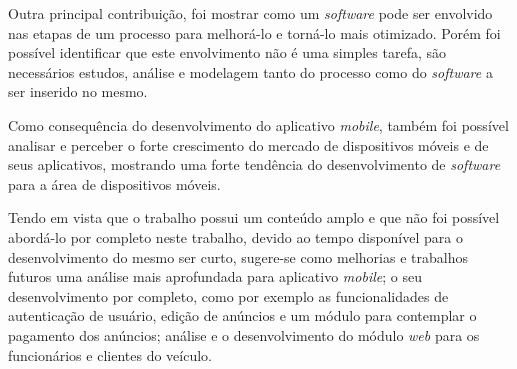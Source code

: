 \documentclass[
	12pt,				%
	openright,			%
	oneside,			%
	a4paper,			%
	chapter=TITLE,		%
	section=TITLE,		%
	english,			%
	french,				%
	spanish,			%
	brazil				%
	]{abntex2}
\begin{document}
Outra principal contribuição, foi mostrar como um \textit{software} pode ser envolvido nas etapas de um processo para melhorá-lo e torná-lo mais otimizado. Porém foi possível identificar que este envolvimento não é uma simples tarefa, são necessários estudos, análise e modelagem tanto do processo como do \textit{software} a ser inserido no mesmo.

Como consequência do desenvolvimento do aplicativo \textit{mobile}, também foi possível analisar e perceber o forte crescimento do mercado de dispositivos móveis e de seus aplicativos, mostrando uma forte tendência do desenvolvimento de \textit{software} para a área de dispositivos móveis.

Tendo em vista que o trabalho possui um conteúdo amplo e que não foi possível abordá-lo por completo neste trabalho, devido ao tempo disponível para o desenvolvimento do mesmo ser curto, sugere-se como melhorias e trabalhos futuros uma análise mais aprofundada para aplicativo \textit{mobile}; o seu desenvolvimento por completo, como por exemplo as funcionalidades de autenticação de usuário, edição de anúncios e um módulo para contemplar o pagamento dos anúncios; análise e o desenvolvimento do módulo \textit{web} para os funcionários e clientes do veículo.






%
%




\label{nropaginas}


\printindex
\end{document}
